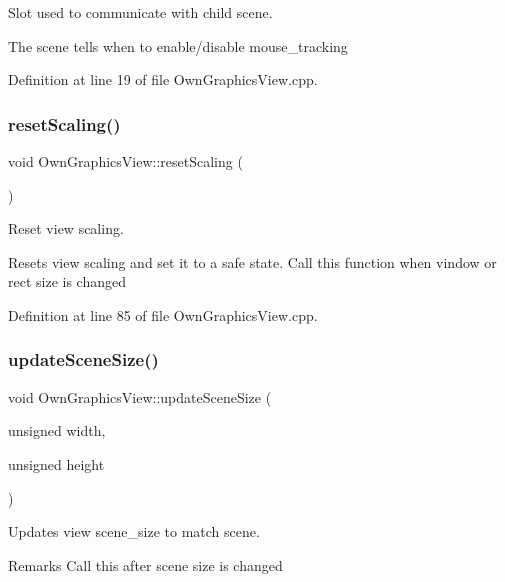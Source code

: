 Slot used to communicate with child scene. 

The scene tells when to enable/disable mouse\+\_\+tracking 

Definition at line 19 of file Own\+Graphics\+View.\+cpp.

\mbox{\label{classOwnGraphicsView_a4aff62ba2da3d0e4a671ec0a8042e242}} 
\subsubsection{\texorpdfstring{reset\+Scaling()}{resetScaling()}}
{\footnotesize\ttfamily void Own\+Graphics\+View\+::reset\+Scaling (\begin{DoxyParamCaption}{ }\end{DoxyParamCaption})}



Reset view scaling. 

Resets view scaling and set it to a safe state. Call this function when vindow or rect size is changed 

Definition at line 85 of file Own\+Graphics\+View.\+cpp.

\mbox{\label{classOwnGraphicsView_aed25dd7c6e958838fcfa7709363ffc9c}} 
\subsubsection{\texorpdfstring{update\+Scene\+Size()}{updateSceneSize()}}
{\footnotesize\ttfamily void Own\+Graphics\+View\+::update\+Scene\+Size (\begin{DoxyParamCaption}\item[{unsigned}]{width,  }\item[{unsigned}]{height }\end{DoxyParamCaption})}



Updates view scene\+\_\+size to match scene. 

\begin{DoxyRemark}{Remarks}
Call this after scene size is changed 
\end{DoxyRemark}

